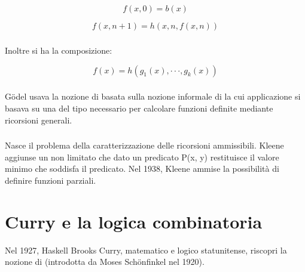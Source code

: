 $$f(x, 0) = b(x)$$

$$f(x, n + 1) = h(x, n , f(x, n))$$
\subsubsection*{}
Inoltre si ha la composizione:

$$f(x) = h(g_1(x), \cdot\cdot\cdot, g_k(x))$$

\subsubsection*{}

G\"odel usava la nozione di  basata
sulla nozione informale di  la cui
applicazione si basava su una  del tipo
necessario per calcolare funzioni definite mediante ricorsioni generali.
\subsubsection{}
Nasce il problema della caratterizzazione delle ricorsioni ammissibili.
Kleene aggiunse un  non limitato
che dato un predicato P(x, y) restituisce il valore minimo che soddisfa
il predicato. 
Nel 1938, Kleene ammise la possibilità di definire funzioni
parziali.

\section{Curry e la logica combinatoria}

Nel 1927, Haskell Brooks Curry, matematico e logico statunitense,
riscopri la nozione di  (introdotta da
Moses Sch\"onfinkel nel 1920).




